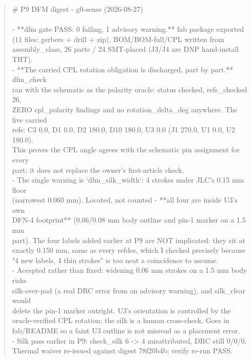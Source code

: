 \documentclass[11pt,a4paper]{article}
\begin{document}
\begin{quote}\small\ttfamily\raggedright
\# P9 DFM digest - g0-sense (2026-08-27)\\
~\\
- {*}{*}dfm gate PASS: 0 failing, 1 advisory warning.{*}{*} fab package exported\\
  (11 files: gerbers + drill + zip), BOM/BOM-full/CPL written from\\
  assembly\_class, 26 parts / 24 SMT-placed (J3/J4 are DNP hand-install THT).\\
- {*}{*}The carried CPL rotation obligation is discharged, part by part.{*}{*} dfm\_check\\
  ran with the schematic as the polarity oracle: status checked, refs\_checked 26,\\
  ZERO cpl\_polarity findings and no rotation\_delta\_deg anywhere. The five carried\\
  refs: C3 0.0, D1 0.0, D2 180.0, D10 180.0, U3 0.0 (J1 270.0, U1 0.0, U2 180.0).\\
  This proves the CPL angle agrees with the schematic pin assignment for every\\
  part; it does not replace the owner's first-article check.\\
- The single warning is `dfm\_silk\_width`: 4 strokes under JLC's 0.15 mm floor\\
  (narrowest 0.060 mm). Located, not counted - {*}{*}all four are inside U3's own\\
  DFN-4 footprint{*}{*} (0.06/0.08 mm body outline and pin-1 marker on a 1.5 mm\\
  part). The four labels added earlier at P9 are NOT implicated: they sit at\\
  exactly 0.150 mm, same as every refdes, which I checked precisely because\\
  "4 new labels, 4 thin strokes" is too neat a coincidence to assume.\\
- Accepted rather than fixed: widening 0.06 mm strokes on a 1.5 mm body risks\\
  silk-over-pad (a real DRC error from an advisory warning), and silk\_clear would\\
  delete the pin-1 marker outright. U3's orientation is controlled by the\\
  oracle-verified CPL rotation; the silk is a human cross-check. Goes in\\
  fab/README so a faint U3 outline is not misread as a placement error.\\
- Silk pass earlier in P9: check\_silk 6 -\textgreater{} 4 misattributed, DRC still 0/0/0.\\
  Thermal waiver re-issued against digest 78f20b4b; verify re-run PASS.
\end{quote}
\end{document}
